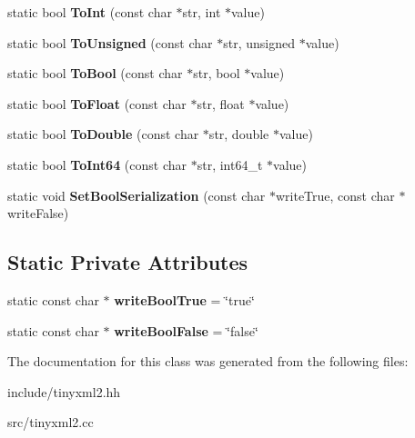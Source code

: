 \begin{DoxyCompactItemize}
\item 
static bool {\bfseries To\+Int} (const char $\ast$str, int $\ast$value)\hypertarget{classtinyxml2_1_1XMLUtil_ad4df4023d11ee3fca9689c49b9707323}{}\label{classtinyxml2_1_1XMLUtil_ad4df4023d11ee3fca9689c49b9707323}

\item 
static bool {\bfseries To\+Unsigned} (const char $\ast$str, unsigned $\ast$value)\hypertarget{classtinyxml2_1_1XMLUtil_a210c8637d5eb4ce3d4625294af0efc2f}{}\label{classtinyxml2_1_1XMLUtil_a210c8637d5eb4ce3d4625294af0efc2f}

\item 
static bool {\bfseries To\+Bool} (const char $\ast$str, bool $\ast$value)\hypertarget{classtinyxml2_1_1XMLUtil_ae5b03e0a1ca5d42052a7ac540f7aa12a}{}\label{classtinyxml2_1_1XMLUtil_ae5b03e0a1ca5d42052a7ac540f7aa12a}

\item 
static bool {\bfseries To\+Float} (const char $\ast$str, float $\ast$value)\hypertarget{classtinyxml2_1_1XMLUtil_a399e71edb5f29d61ea81d91ee0332bb9}{}\label{classtinyxml2_1_1XMLUtil_a399e71edb5f29d61ea81d91ee0332bb9}

\item 
static bool {\bfseries To\+Double} (const char $\ast$str, double $\ast$value)\hypertarget{classtinyxml2_1_1XMLUtil_ad8f75ac140fb19c1c6e164a957c4cd53}{}\label{classtinyxml2_1_1XMLUtil_ad8f75ac140fb19c1c6e164a957c4cd53}

\item 
static bool {\bfseries To\+Int64} (const char $\ast$str, int64\+\_\+t $\ast$value)\hypertarget{classtinyxml2_1_1XMLUtil_afe2ea09257431cd2b4b6d440552e4195}{}\label{classtinyxml2_1_1XMLUtil_afe2ea09257431cd2b4b6d440552e4195}

\item 
static void {\bfseries Set\+Bool\+Serialization} (const char $\ast$write\+True, const char $\ast$write\+False)\hypertarget{classtinyxml2_1_1XMLUtil_af98a6a80dbeec4679366c1aba4c5b747}{}\label{classtinyxml2_1_1XMLUtil_af98a6a80dbeec4679366c1aba4c5b747}

\end{DoxyCompactItemize}
\subsection*{Static Private Attributes}
\begin{DoxyCompactItemize}
\item 
static const char $\ast$ {\bfseries write\+Bool\+True} = \char`\"{}true\char`\"{}\hypertarget{classtinyxml2_1_1XMLUtil_aafa8c6e965f8f95d5bcd9e7646983470}{}\label{classtinyxml2_1_1XMLUtil_aafa8c6e965f8f95d5bcd9e7646983470}

\item 
static const char $\ast$ {\bfseries write\+Bool\+False} = \char`\"{}false\char`\"{}\hypertarget{classtinyxml2_1_1XMLUtil_ae09aaf302e2ab8c196e14643ef98e3a3}{}\label{classtinyxml2_1_1XMLUtil_ae09aaf302e2ab8c196e14643ef98e3a3}

\end{DoxyCompactItemize}


The documentation for this class was generated from the following files\+:\begin{DoxyCompactItemize}
\item 
include/tinyxml2.\+hh\item 
src/tinyxml2.\+cc\end{DoxyCompactItemize}
